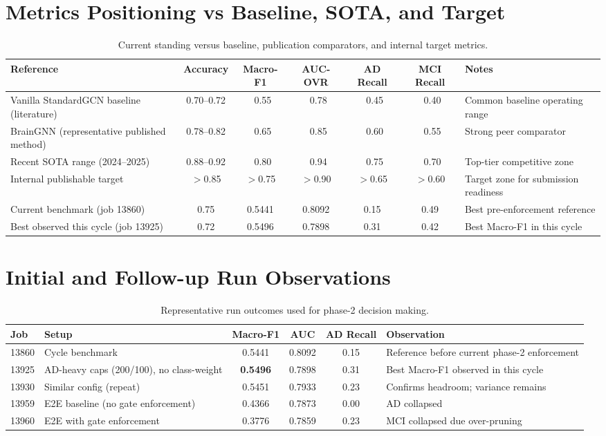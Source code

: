 \documentclass[11pt,a4paper]{article}
\begin{document}
\section{Metrics Positioning vs Baseline, SOTA, and Target}
\begin{table}[H]
\centering
\scriptsize
\begin{tabular}{@{}p{3.2cm}ccccc p{4.0cm}@{}}
\toprule
Reference & Accuracy & Macro-F1 & AUC-OVR & AD Recall & MCI Recall & Notes \\
\midrule
Vanilla StandardGCN baseline (literature) & 0.70--0.72 & ~0.55 & ~0.78 & ~0.45 & ~0.40 & Common baseline operating range \\
BrainGNN (representative published method) & 0.78--0.82 & ~0.65 & ~0.85 & ~0.60 & ~0.55 & Strong peer comparator \\
Recent SOTA range (2024--2025) & 0.88--0.92 & ~0.80 & ~0.94 & ~0.75 & ~0.70 & Top-tier competitive zone \\
Internal publishable target & $>$0.85 & $>$0.75 & $>$0.90 & $>$0.65 & $>$0.60 & Target zone for submission readiness \\
\midrule
Current benchmark (job 13860) & 0.75 & 0.5441 & 0.8092 & 0.15 & 0.49 & Best pre-enforcement reference \\
Best observed this cycle (job 13925) & 0.72 & 0.5496 & 0.7898 & 0.31 & 0.42 & Best Macro-F1 in this cycle \\
\bottomrule
\end{tabular}
\caption{Current standing versus baseline, publication comparators, and internal target metrics.}
\end{table}

\section{Initial and Follow-up Run Observations}
\begin{table}[H]
\centering
\scriptsize
\begin{tabular}{@{}p{1.2cm} p{4.1cm} c c c p{4.6cm}@{}}
\toprule
Job & Setup & Macro-F1 & AUC & AD Recall & Observation \\
\midrule
13860 & Cycle benchmark & 0.5441 & 0.8092 & 0.15 & Reference before current phase-2 enforcement \\
13925 & AD-heavy caps (200/100), no class-weight & \textbf{0.5496} & 0.7898 & 0.31 & Best Macro-F1 observed in this cycle \\
13930 & Similar config (repeat) & 0.5451 & 0.7933 & 0.23 & Confirms headroom; variance remains \\
13959 & E2E baseline (no gate enforcement) & 0.4366 & 0.7873 & 0.00 & AD collapsed \\
13960 & E2E with gate enforcement & 0.3776 & 0.7859 & 0.23 & MCI collapsed due over-pruning \\
\bottomrule
\end{tabular}
\caption{Representative run outcomes used for phase-2 decision making.}
\end{table}
\end{document}
